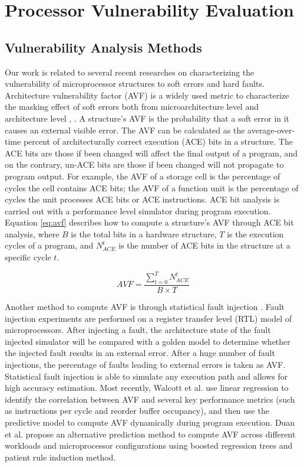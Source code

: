 \section{Processor Vulnerability Evaluation}
\subsection{Vulnerability Analysis Methods}
Our work is related to several recent researches on characterizing the vulnerability of microprocessor structures to soft errors and hard faults. Architecture vulnerability factor (AVF) is a widely used metric to characterize the masking effect of soft errors both from microarchitecture level and architecture level \cite{mukherjee2003systematic},\cite{biswas2005computing} \cite{fu2006sim}. A structure’s AVF is the probability that a soft error in it causes an external visible error. The AVF can be calculated as the average-over-time percent of architecturally correct execution (ACE) bits in a structure. The ACE bits are those if been changed will affect the final output of a program, and on the contrary, un-ACE bits are those if been changed will not propagate to program output. For example, the AVF of a storage cell is the percentage of cycles the cell contains ACE bits; the AVF of a function unit is the percentage of cycles the unit processes ACE bits or ACE instructions. ACE bit analysis is carried out with a performance level simulator during program execution. Equation \ref{eq:avf} describes how to compute a structure’s AVF through ACE bit analysis, where $B$ is the total bits in a hardware structure, $T$ is the execution cycles of a program, and $N_{ACE}^{t}$ is the number of ACE bits in the structure at a specific cycle $t$.

\begin{equation} \label{eq:avf}
    AVF=\frac{\sum_{t=0}^{T}N_{ACE}^{t}}{B \times T}
\end{equation}


Another method to compute AVF is through statistical fault injection \cite{wang2004characterizing} \cite{touloupis2007study}. Fault injection experiments are performed on a register transfer level (RTL) model of microprocessors. After injecting a fault, the architecture state of the fault injected simulator will be compared with a golden model to determine whether the injected fault results in an external error. After a huge number of fault injections, the percentage of faults leading to external errors is taken as AVF. Statistical fault injection is able to simulate any execution path and allows for high accuracy estimation. Most recently, Walcott et al. \cite{walcott2007dynamic} use linear regression to identify the correlation between AVF and several key performance metrics (such as instructions per cycle and reorder buffer occupancy), and then use the predictive model to compute AVF dynamically during program execution. Duan et al. \cite{duan2009versatile} propose an alternative prediction method to compute AVF across different workloads and microprocessor configurations using boosted regression trees and patient rule induction method.

